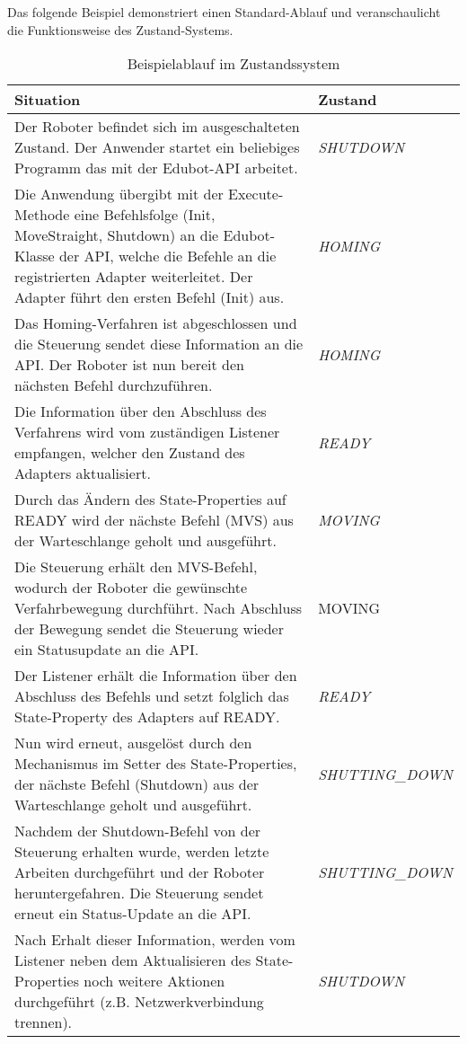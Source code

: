 Das folgende Beispiel demonstriert einen Standard-Ablauf und veranschaulicht die Funktionsweise des Zustand-Systems.
\begin{table}[H]
\begin{tabular}{|p{10cm}|p{4cm}|}
\hline \rowcolor{lightgray} \hline
\textbf{Situation} & \textbf{Zustand}\\
\hline
Der Roboter befindet sich im ausgeschalteten Zustand. Der Anwender startet ein beliebiges Programm das mit der Edubot-API arbeitet. & \textit{SHUTDOWN}\\
\hline
Die Anwendung übergibt mit der Execute-Methode eine Befehlsfolge (Init, MoveStraight, Shutdown) an die Edubot-Klasse der API, welche die Befehle an die registrierten Adapter weiterleitet. Der Adapter führt den ersten Befehl (Init) aus. & \textit{HOMING}\\
\hline
Das Homing-Verfahren ist abgeschlossen und die Steuerung sendet diese Information an die API. Der Roboter ist nun bereit den nächsten Befehl durchzuführen. & \textit{HOMING}\\
\hline
Die Information über den Abschluss des Verfahrens wird vom zuständigen Listener empfangen, welcher den Zustand des Adapters aktualisiert. & \textit{READY}\\
\hline
Durch das Ändern des State-Properties auf READY wird der nächste Befehl (MVS) aus der Warteschlange geholt und ausgeführt. & \textit{MOVING}\\
\hline
Die Steuerung erhält den MVS-Befehl, wodurch der Roboter die gewünschte Verfahrbewegung durchführt. Nach Abschluss der Bewegung sendet die Steuerung wieder ein Statusupdate an die API.	 & MOVING\\
\hline
Der Listener erhält die Information über den Abschluss des Befehls und setzt folglich das State-Property des Adapters auf READY. & \textit{READY}\\
\hline
Nun wird erneut, ausgelöst durch den Mechanismus im Setter des State-Properties, der nächste Befehl (Shutdown) aus der Warteschlange geholt und ausgeführt. & \textit{SHUTTING\_DOWN}\\
\hline
Nachdem der Shutdown-Befehl von der Steuerung erhalten wurde, werden letzte Arbeiten durchgeführt und der Roboter heruntergefahren. Die Steuerung sendet erneut ein Status-Update an die API. & \textit{SHUTTING\_DOWN}\\
\hline
Nach Erhalt dieser Information, werden vom Listener neben dem Aktualisieren des State-Properties noch weitere Aktionen durchgeführt (z.B. Netzwerkverbindung trennen). & \textit{SHUTDOWN}\\
\hline
\end{tabular}
\caption{Beispielablauf im Zustandssystem}
\end{table}
\newpage